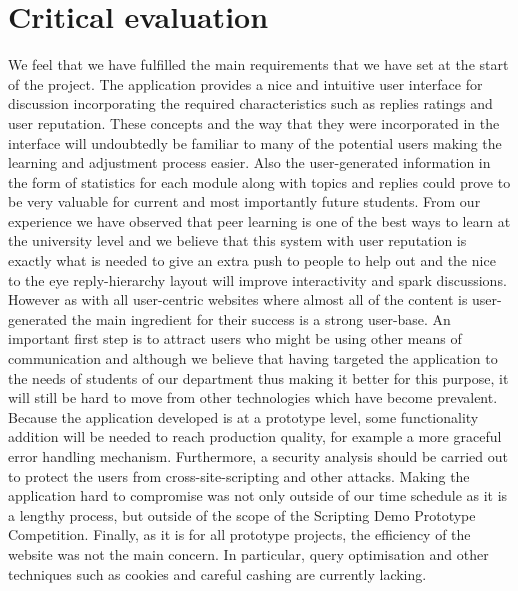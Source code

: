 \documentclass[12pt,a4paper,titlepage]{article}
\begin{document}
\section{Critical evaluation}
We feel that we have fulfilled the main requirements that we have set at the start of the project. The application provides a nice and intuitive user interface for discussion incorporating the required characteristics such as replies ratings and user reputation. These concepts and the way that they were incorporated in the interface will undoubtedly be familiar to many of the potential users making the learning and adjustment process easier. Also the user-generated information in the form of statistics for each module along with topics and replies could prove to be very valuable for current and most importantly future students. From our experience we have observed that peer learning is one of the best ways to learn at the university level and we believe that this system with user reputation is exactly what is needed to give an extra push to people to help out and the nice to the eye reply-hierarchy layout will improve interactivity and spark discussions.\\

However as with all user-centric websites where almost all of the content is user-generated the main ingredient for their success is a strong user-base. An important first step is to attract users who might be using other means of communication and although we believe that having targeted the application to the needs of students of our department thus making it better for this purpose, it will still be hard to move from other technologies which have become prevalent.\\

Because the application developed is at a prototype level, some functionality addition will be needed to reach production quality, for example a more graceful error handling mechanism. Furthermore, a security analysis should be carried out to protect the users from cross-site-scripting and other attacks. Making the application hard to compromise was not only outside of our time schedule as it is a lengthy process, but outside of the scope of the Scripting Demo Prototype Competition. Finally, as it is for all prototype projects, the efficiency of the website was not the main concern. In particular, query optimisation and other techniques such as cookies and careful cashing are currently lacking.
\end{document}
